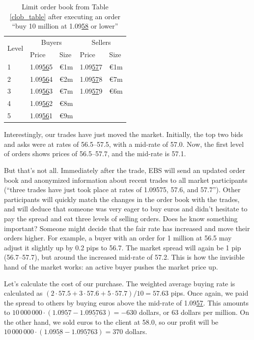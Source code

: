 \documentclass[a4paper,14pt]{extarticle}
\begin{document}
\begin{table}[h]
\centering
\begin{tabular}{l|l|l|l|l}
\multirow{2}{*}{Level} & \multicolumn{2}{c|}{Buyers} &
\multicolumn{2}{c}{Sellers} \\ \cline{2-5}
& Price & Size & Price & Size \\ \hline
1 & 1.09\underline{56}5 & \euro1m & 1.09\underline{57}7 & \euro1m \\
2 & 1.09\underline{56}4 & \euro2m & 1.09\underline{57}8 & \euro7m \\
3 & 1.09\underline{56}3 & \euro7m & 1.09\underline{57}9 & \euro6m \\
4 & 1.09\underline{56}2 & \euro8m & & \\
5 & 1.09\underline{56}1 & \euro9m & &
\end{tabular}
\caption{Limit order book from Table \ref{clob_table} after executing an order
``buy 10 million at 1.09\underline{58} or lower''}
\label{clob_table_2}
\end{table}

Interestingly, our trades have just moved the market. Initially, the top two 
bids and asks were at rates of 56.5--57.5, with a mid-rate of 57.0. Now, the 
first level of orders shows prices of 56.5--57.7, and the mid-rate is 57.1.

But that's not all. Immediately after the trade, EBS will send an updated order 
book and anonymized information about recent trades to all market participants 
(``three trades have just took place at rates of 1.09575, 57.6, and 57.7''). 
Other participants will quickly match the changes in the order book with the 
trades, and will deduce that someone was very eager to buy euros and didn't 
hesitate to pay the spread and eat three levels of selling orders. Does 
he know something important? Someone might decide that the fair rate has 
increased and move their orders higher. For example, a buyer with an order for 1 
million at 56.5 may adjust it slightly up by 0.2 pips to 56.7. The market spread 
will again be 1 pip (56.7--57.7), but around the increased mid-rate of 57.2. 
This is how the invisible hand of the market works: an active buyer pushes  
the market price up.

Let's calculate the cost of our purchase. The weighted average buying rate is 
calculated as $(2 \cdot 57.5 + 3 \cdot 57.6 + 5 \cdot 57.7)/10 = 57.63$ pips. 
Once again, we paid the spread to others by buying euros above the mid-rate of 
1.09\underline{57}. This amounts to $10\,000\,000 \cdot (1.09\underline{57} - 
1.09\underline{57}63) = -630$ dollars, or 63 dollars per million. On the other 
hand, we sold euros to the client at 58.0, so our profit will be $10\,000\,000 
\cdot (1.09\underline{58} - 1.09\underline{57}63) = 370$ dollars.
\end{document}
